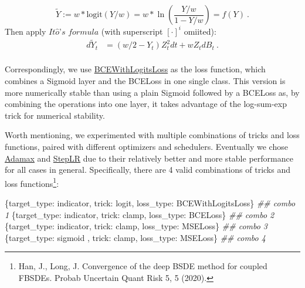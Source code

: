 \documentclass[
]{article}
\newenvironment{Shaded}{}{}
\newcommand{\CommentTok}[1]{\textcolor[rgb]{0.38,0.63,0.69}{\textit{#1}}}
\newcommand{\NormalTok}[1]{#1}
\newcommand{\StringTok}[1]{\textcolor[rgb]{0.25,0.44,0.63}{#1}}
\begin{document}
\[
\tilde{Y} := w*\text{logit} (Y/w) = w*\ln\left(\frac{Y/w}{1-Y/w}\right)=f(Y)~.
\]Then apply \(\textit{It}\hat{o} \textit{'s formula}\) (with
superscript \([\cdot]^i\) omiited): \[
\begin{aligned} 
    d \tilde{Y}_t &= (w/2-Y_t)Z_t^2dt + wZ_tdB_t~.\\
\end{aligned}
\]

Correspondingly, we use
\href{https://pytorch.org/docs/stable/generated/torch.nn.BCEWithLogitsLoss.html}{BCEWithLogitsLoss}
as the loss function, which combines a Sigmoid layer and the BCELoss in
one single class. This version is more numerically stable than using a
plain Sigmoid followed by a BCELoss as, by combining the operations into
one layer, it takes advantage of the log-sum-exp trick for numerical
stability.

Worth mentioning, we experimented with multiple combinations of tricks
and loss functions, paired with different optimizers and schedulers.
Eventually we chose
\href{https://pytorch.org/docs/stable/generated/torch.optim.Adamax.html}{Adamax}
and
\href{https://pytorch.org/docs/stable/generated/torch.optim.lr_scheduler.StepLR.html}{StepLR}
due to their relatively better and more stable performance for all cases
in general. Specifically, there are 4 valid combinations of tricks and
loss functions\footnote{Han, J., Long, J. Convergence of the deep BSDE
  method for coupled FBSDEs. Probab Uncertain Quant Risk 5, 5 (2020).}:

\begin{Shaded}
\begin{Highlighting}[]
\NormalTok{\{target\_type: }\StringTok{\textquotesingle{}indicator\textquotesingle{}}\NormalTok{, trick: }\StringTok{\textquotesingle{}logit\textquotesingle{}}\NormalTok{, loss\_type: }\StringTok{\textquotesingle{}BCEWithLogitsLoss\textquotesingle{}}\NormalTok{\}  }\CommentTok{\#\# combo 1}
\NormalTok{\{target\_type: }\StringTok{\textquotesingle{}indicator\textquotesingle{}}\NormalTok{, trick: }\StringTok{\textquotesingle{}clamp\textquotesingle{}}\NormalTok{, loss\_type: }\StringTok{\textquotesingle{}BCELoss\textquotesingle{}}\NormalTok{\}            }\CommentTok{\#\# combo 2}
\NormalTok{\{target\_type: }\StringTok{\textquotesingle{}indicator\textquotesingle{}}\NormalTok{, trick: }\StringTok{\textquotesingle{}clamp\textquotesingle{}}\NormalTok{, loss\_type: }\StringTok{\textquotesingle{}MSELoss\textquotesingle{}}\NormalTok{\}            }\CommentTok{\#\# combo 3}
\NormalTok{\{target\_type: }\StringTok{\textquotesingle{}sigmoid\textquotesingle{}}\NormalTok{  , trick: }\StringTok{\textquotesingle{}clamp\textquotesingle{}}\NormalTok{, loss\_type: }\StringTok{\textquotesingle{}MSELoss\textquotesingle{}}\NormalTok{\}            }\CommentTok{\#\# combo 4}
\end{Highlighting}
\end{Shaded}
\end{document}
